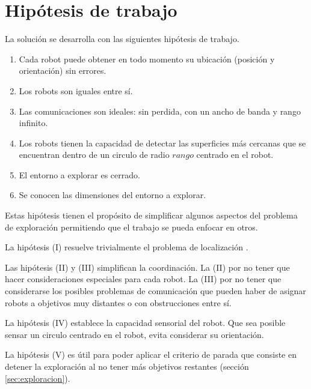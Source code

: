 
\section{Hipótesis de trabajo}\label{sec:hip}
La solución se desarrolla con las siguientes hipótesis de trabajo.
\begin{enumerate}[label=(\roman*)]
  \item Cada robot puede obtener en todo momento su ubicación (posición y
    orientación) sin errores.
  \item Los robots son iguales entre sí.
  \item Las comunicaciones son ideales: sin perdida, con un ancho de banda y rango infinito.
  \item Los robots tienen la capacidad de detectar las superficies más cercanas
    que se encuentran dentro de un circulo de radio $rango$ centrado en el
    robot.
  \item El entorno a explorar es cerrado.
  \item Se conocen las dimensiones del entorno a explorar.
\end{enumerate}

Estas hipótesis tienen el propósito de simplificar algunos aspectos del problema de
exploración permitiendo que el trabajo se pueda enfocar en otros.

La hipótesis (I) resuelve trivialmente el problema de localización \cite{slam}. 

Las hipótesis (II) y (III) simplifican la coordinación. La (II) por no tener
que hacer consideraciones especiales para cada robot. La (III) por no tener que
considerarse los posibles problemas de comunicación que pueden haber de asignar
robots a objetivos muy distantes o con obstrucciones entre sí. 

La hipótesis (IV) establece la capacidad sensorial del robot. Que sea posible 
sensar un circulo centrado en el robot, evita considerar su orientación.

La hipótesis (V) es útil para poder aplicar el criterio de parada que consiste
en detener la exploración al no tener más objetivos restantes (sección
\ref{sec:exploracion}). 

